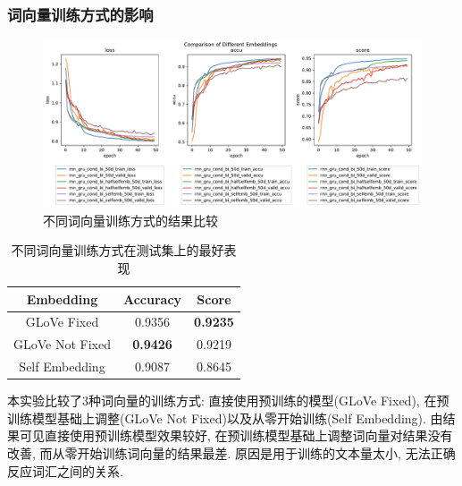 \documentclass[a4paper]{article}
\begin{document}
	\subsubsection{词向量训练方式的影响}
	\begin{figure}[H]
		\centering
		\includegraphics[width=\textwidth]{comparison_of_different_embeddings.pdf}
		\caption{不同词向量训练方式的结果比较}
		\label{comparison_of_different_embeddings}
	\end{figure}
	\begin{table}[H]
		\centering
		\caption{不同词向量训练方式在测试集上的最好表现}
		\label{embperf}
		\begin{tabular}{@{}ccc@{}}
			\toprule
			\textbf{Embedding}                  & \textbf{Accuracy} & \textbf{Score}  \\ \midrule
			GLoVe Fixed   & 0.9356            & \textbf{0.9235}          \\
			GLoVe Not Fixed                 & \textbf{0.9426}            & 0.9219          \\
			Self Embedding                & 0.9087 & 0.8645          \\ \bottomrule
		\end{tabular}
	\end{table}
	本实验比较了3种词向量的训练方式: 直接使用预训练的模型(GLoVe Fixed), 在预训练模型基础上调整(GLoVe Not Fixed)以及从零开始训练(Self Embedding). 由结果可见直接使用预训练模型效果较好, 在预训练模型基础上调整词向量对结果没有改善, 而从零开始训练词向量的结果最差. 原因是用于训练的文本量太小, 无法正确反应词汇之间的关系.
\end{document}
